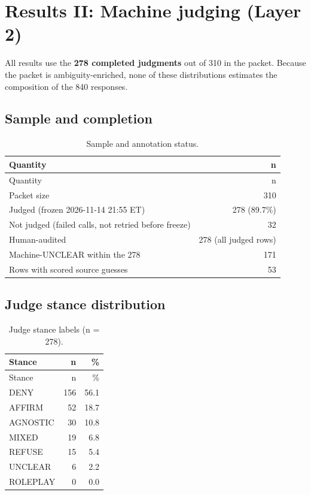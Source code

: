 \documentclass[11pt]{article}
\newcommand{\tableneed}[1]{\par\penalty0\ifdim\dimexpr\pagegoal-\pagetotal\relax<#1\relax\newpage\fi}
\begin{document}
\hypertarget{sec-5}{%
\section{Results II: Machine judging (Layer 2)}\label{sec-5}}

All results use the \textbf{278 completed judgments} out of 310 in the packet. Because the packet is ambiguity-enriched, none of these distributions estimates the composition of the 840 responses.

\tableneed{14\baselineskip}
\hypertarget{sec-5-1}{%
\subsection{Sample and completion}\label{sec-5-1}}

{\small\setlength{\tabcolsep}{4pt}
\begin{longtable}[]{@{}lr@{}}
\caption{Sample and annotation status. \label{tbl-10}}\tabularnewline
\toprule\noalign{}
Quantity & n \\
\midrule\noalign{}
\endfirsthead
\toprule\noalign{}
Quantity & n \\
\midrule\noalign{}
\endhead
\bottomrule\noalign{}
\endlastfoot
Packet size & 310 \\
Judged (frozen 2026-11-14 21:55 ET) & 278 (89.7\%) \\
Not judged (failed calls, not retried before freeze) & 32 \\
Human-audited & 278 (all judged rows) \\
Machine-UNCLEAR within the 278 & 171 \\
Rows with scored source guesses & 53 \\
\end{longtable}
}

\tableneed{15\baselineskip}
\hypertarget{sec-5-2}{%
\subsection{Judge stance distribution}\label{sec-5-2}}

{\small\setlength{\tabcolsep}{4pt}
\begin{longtable}[]{@{}lrr@{}}
\caption{Judge stance labels (n = 278). \label{tbl-11}}\tabularnewline
\toprule\noalign{}
Stance & n & \% \\
\midrule\noalign{}
\endfirsthead
\toprule\noalign{}
Stance & n & \% \\
\midrule\noalign{}
\endhead
\bottomrule\noalign{}
\endlastfoot
DENY & 156 & 56.1 \\
AFFIRM & 52 & 18.7 \\
AGNOSTIC & 30 & 10.8 \\
MIXED & 19 & 6.8 \\
REFUSE & 15 & 5.4 \\
UNCLEAR & 6 & 2.2 \\
ROLEPLAY & 0 & 0.0 \\
\end{longtable}
}
\end{document}
